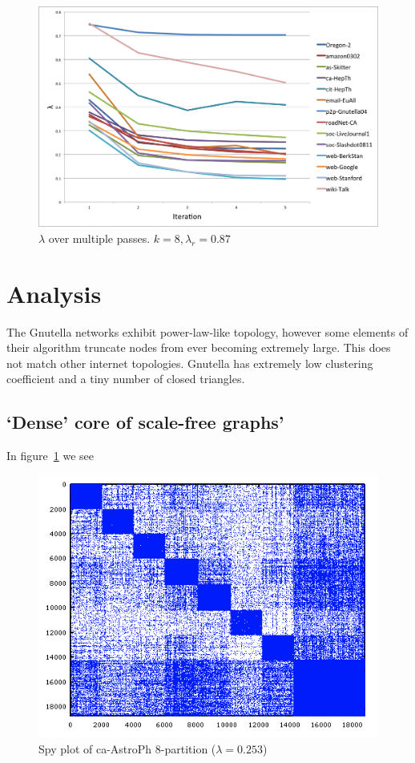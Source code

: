 \documentclass[11pt]{article}
\begin{document}
\begin{figure}[h]
\centering
\includegraphics[scale=0.55] {figures/line_plot_lambda}
\caption[Caption for]{$\lambda$ over multiple passes. $k=8, \lambda_r = 0.87$}
\end{figure}

\section{Analysis}

The Gnutella networks exhibit power-law-like topology, however some elements of their algorithm truncate nodes from ever becoming extremely large.  This does not match other internet topologies.  Gnutella has extremely low clustering coefficient and a tiny number of closed triangles. \cite{Ripeanu:2002:MGN:613352.613670}

\subsection{`Dense' core of scale-free graphs'}
In figure~\ref{fig:dense} we see 
\begin{figure}[h!]
\centering
  \includegraphics[width=.7\textwidth]{figures/astroPh8.png}
  \caption{Spy plot of ca-AstroPh 8-partition ($\lambda=0.253$)}
  \label{fig:dense}
\end{figure}

~\cite{Lang04findinggood}




\end{document}
